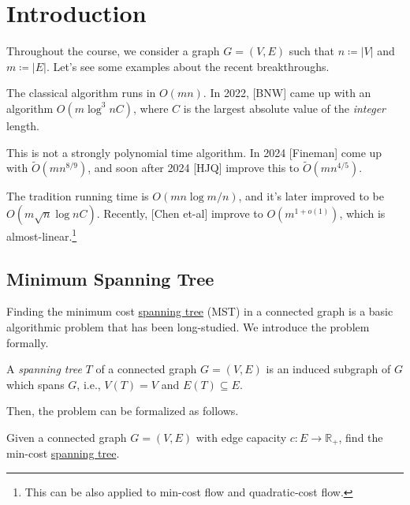 \chapter{Introduction}
Throughout the course, we consider a graph \(G=(V, E)\) such that \(n \coloneqq \lvert V \rvert \) and \(m\coloneqq \lvert E \rvert \). Let's see some examples about the recent breakthroughs.

\begin{eg}
	The classical algorithm runs in \(O(mn)\). In 2022, [BNW] came up with an algorithm \(O(m \log ^3 n C)\), where \(C\) is the largest absolute value of the \emph{integer} length.

	This is not a strongly polynomial time algorithm. In 2024 [Fineman] come up with \(\widetilde{O} (m n^{8 / 9})\), and soon after 2024 [HJQ] improve this to \(\widetilde{O} (m n^{4 / 5})\).
\end{eg}

\begin{eg}
	The tradition running time is \(O(mn \log m / n)\), and it's later improved to be \(O(m \sqrt{n} \log n C)\). Recently, [Chen et-al] improve to \(O(m^{1 + o(1)})\), which is almost-linear.\footnote{This can be also applied to min-cost flow and quadratic-cost flow.}
\end{eg}

\section{Minimum Spanning Tree}
Finding the minimum cost \hyperref[def:spanning-tree]{spanning tree} (MST) in a connected graph is a basic algorithmic problem that has been long-studied. We introduce the problem formally.

\begin{definition}\label{def:spanning-tree}
	A \emph{spanning tree} \(T\) of a connected graph \(G =(V, E)\) is an induced subgraph of \(G\) which spans \(G\), i.e., \(V(T) = V\) and \(E(T) \subseteq E\).
\end{definition}

Then, the problem can be formalized as follows.

\begin{problem}\label{prb:MST}
Given a connected graph \(G=(V, E)\) with edge capacity \(c \colon E \to \mathbb{R} _+ \), find the min-cost \hyperref[def:spanning-tree]{spanning tree}.
\end{problem}

